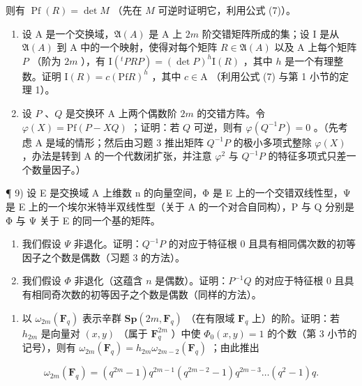 则有 \(\operatorname{Pf}(R) = \det M\) （先在 \(M\) 可逆时证明它，利用公式 (7)）。

\begin{enumerate}
\def\labelenumi{\arabic{enumi})}
\setcounter{enumi}{6}
\item
  设 A 是一个交换域，\(\mathfrak{A}(A)\) 是 A 上 \(2m\) 阶交错矩阵所成的集；设 I 是从 \(\mathfrak{A}(A)\) 到 A 中的一个映射，使得对每个矩阵 \(R\in\mathfrak{A}(A)\) 以及 A 上每个矩阵 \(P\) （阶为 \(2m\) ），有 \(\mathrm{I}(^{t}PRP)=(\det P)^{h}\mathrm{I}(R)\) ，其中 \(h\) 是一个有理整数。证明 \(\mathrm{I}(R)=c(\mathrm{Pf}R)^{h}\) ，其中 \(c\in\mathrm{A}\) （利用公式 (7) 与第 1 小节的定理 1）。
\item
  设 \(P\) 、\(Q\) 是交换环 A 上两个偶数阶 \(2m\) 的交错方阵。令 \(\varphi(X) = \mathrm{Pf}(P - XQ)\) ；证明：若 \(Q\) 可逆，则有 \(\varphi(Q^{-1}P)=0\) 。（先考虑 A 是域的情形；然后由习题 3 推出矩阵 \(Q^{-1}P\) 的极小多项式整除 \(\varphi(X)\) ，办法是转到 A 的一个代数闭扩张，并注意 \(\varphi^{2}\) 与 \(Q^{-1}P\) 的特征多项式只差一个数量因子。）
\end{enumerate}

¶ 9) 设 E 是交换域 A 上维数 n 的向量空间，Φ 是 E 上的一个交错双线性型，Ψ 是 E 上的一个埃尔米特半双线性型（关于 A 的一个对合自同构），P 与 Q 分别是 Φ 与 Ψ 关于 E 的同一个基的矩阵。

\begin{enumerate}
\def\labelenumi{\alph{enumi})}
\item
  我们假设 \(\Psi\) 非退化。证明：\(Q^{-1}P\) 的对应于特征根 0 且具有相同偶次数的初等因子之个数是偶数（习题 3 的方法）。
\item
  我们假设 \(\Phi\) 非退化（这蕴含 \(n\) 是偶数）。证明：\(P^{-1}Q\) 的对应于特征根 0 且具有相同奇次数的初等因子之个数是偶数（同样的方法）。
\end{enumerate}

\begin{enumerate}
\def\labelenumi{\arabic{enumi})}
\setcounter{enumi}{9}
\tightlist
\item
  以 \(\omega_{2m}(\mathbf{F}_q)\) 表示辛群 \(\mathbf{Sp}(2m, \mathbf{F}_q)\) （在有限域 \(\mathbf{F}_q\) 上）的阶。证明：若 \(h_{2m}\) 是向量对 \((x, y)\) （属于 \(\mathbf{F}_q^{2m}\) ）中使 \(\Phi_0(x, y) = 1\) 的个数（第 3 小节的记号），则有 \(\omega_{2m}(\mathbf{F}_q) = h_{2m}\omega_{2m-2}(\mathbf{F}_q)\) ；由此推出
\end{enumerate}

\[
\omega_ {2 m} (\mathbf {F} _ {q}) = (q ^ {2 m} - 1) q ^ {2 m - 1} (q ^ {2 m - 2} - 1) q ^ {2 m - 3} \dots (q ^ {2} - 1) q.
\]

